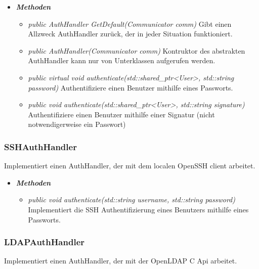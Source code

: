 \documentclass[a4paper,12pt]{article}
\begin{document}
	\begin{itemize}[label={}]

	\item\textit{\textbf{Methoden}}
		\begin{itemize}[label={\textbullet}]
			\item\textit{public AuthHandler GetDefault(Communicator comm)} Gibt einen Allzweck AuthHandler zurück, der in jeder Situation funktioniert.
			\item\textit{public AuthHandler(Communicator comm)} Kontruktor des abstrakten AuthHandler kann nur von Unterklassen aufgerufen werden.
			\item\textit{public virtual void authenticate(std::shared\_ptr<User>, std::string password)} Authentifiziere einen Benutzer mithilfe eines Passworts.
			\item\textit{public void authenticate(std::shared\_ptr<User>, std::string signature)} Authentifiziere einen Benutzer mithilfe einer Signatur (nicht notwendigerweise ein Passwort)
			
		\end{itemize}

\end{itemize}


\subsubsection{SSHAuthHandler}

Implementiert einen AuthHandler, der mit dem localen OpenSSH client arbeitet.

	\begin{itemize}[label={}]

	\item\textit{\textbf{Methoden}}
		\begin{itemize}[label={\textbullet}]
			\item\textit{public void authenticate(std::string username, std::string password)} Implementiert die SSH Authentifizierung eines Benutzers mithilfe eines Passworts.
		\end{itemize}

\end{itemize}


\subsubsection{LDAPAuthHandler}

Implementiert einen AuthHandler, der mit der OpenLDAP C Api arbeitet.
\end{document}
